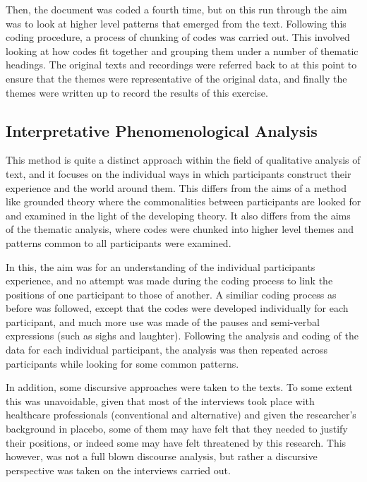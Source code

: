 Then, the document was coded a fourth time, but on this run through the aim was to look at higher level patterns that emerged from the text. Following this coding procedure, a process of chunking of codes was carried out. This involved looking at how codes fit together and grouping them under a number of thematic headings. The original texts and recordings were referred back to at this point to ensure that the themes were representative of the original data, and finally the themes were written up to record the results of this exercise.

\subsection{Interpretative Phenomenological Analysis}

This method is quite a distinct approach within the field of qualitative analysis of text, and it focuses on the individual ways in which participants construct their experience and the world around them\cite{smith2003interpretative}.  This differs from the aims of a method like grounded theory \cite{glaser1977discovery} where the commonalities between participants are looked for and examined in the light of the developing theory. It also differs from the aims of the thematic analysis, where codes were chunked into higher level themes and patterns common to all participants were examined.

In this, the aim was for an understanding of the individual participants experience, and no attempt was made during the coding process to link the positions of one participant to those of another. A similiar coding process as before was followed, except that the codes were developed individually for each participant, and much more use was made of the pauses and semi-verbal expressions (such as sighs and laughter). Following the analysis and coding of the data for each individual participant, the analysis was then repeated across participants while looking for some common patterns.

In addition, some discursive approaches were taken to the texts. To some extent this was unavoidable, given that most of the interviews took place with healthcare professionals (conventional and alternative) and given the researcher's background in placebo, some of them may have felt that they needed to justify their positions, or indeed some may have felt threatened by this research. This however, was not a full blown discourse analysis, but rather a discursive perspective was taken on the interviews carried out.

